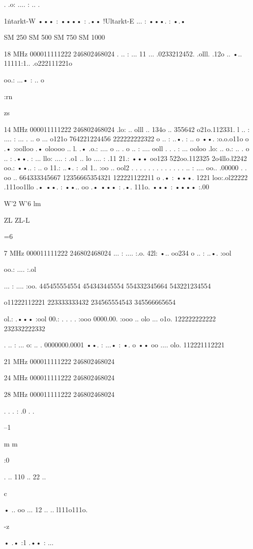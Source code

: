 . .o: .... : .. .

1\.ntarkt-W ••• : •••• : .••
!Ultarkt-E ... : •••. : •.•

SM 250
SM 500
SM 750
SM 1000

18 MHz
000011111222
246802468024
. .. : ... 11 ...
.0233212452.
.olll. .12o ..
•.. 11111:1..
.o222111221o

oo.: ...• : .. o

:rn

zs

14 MHz
000011111222
246802468024
.lo: .. olll ..
134o .. 355642
o21o.112331.
l .. : .... : ...
. .. o ... o121o
764221224456
222222222322
o .. : ..•. : .. o
••. :o.o.o11o
o .• :oolloo .•
oloooo .. l. .•
.o.: .... o .. .
o .. : .... ooll . . . : ... ooloo .lo: .. o.: .. .
o .. : .••. : ... llo: .... : .o1 .. lo .... : .11
21.: ••• oo123 522oo.112325 2o4llo.l2242
oo.: ••.. : .. o 11.: ..•. : .ol 1.. :oo .. ool2
. . . . . . . . . . . . . .. : .... oo.. .00000 . . oo ..
664333345667 12356665354321 122221122211
o .• : •••. 1221 loo:.ol22222 .111oo1llo .•
••. : ••.. oo .• ••• : .•. 111o.
••• : •••• :.00

W'2
W'6
lm

ZL
ZL-L

=6

7 MHz
000011111222
246802468024
... : .... :.o.
42l: •.. oo234
o .. : ..•. :ool

oo.: .... :.ol

... : .... :oo.
445455554554
454343445554
554332345664
543221234554

o11222112221
223333333432
234565554543
345566665654

ol.: .••• :ool
00.: . . . . :ooo
0000.00. :ooo
.. olo ... o1o.
122222222222
232332222332

. .. : ... o: .. .
0000000.0001
••. : ...• : •. o
•• oo .... olo.
112221112221

21 MHz
000011111222
246802468024

24 MHz
000011111222
246802468024

28 MHz
000011111222
246802468024

. . . : .0 . .

--1

m
m

:0

. .. 110 .. 22 ..

c

• .. oo ... 12 ..
.. l111o111o.

-z

• .• :1 .•• : ...

